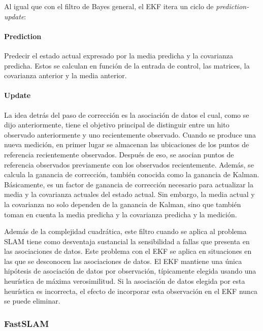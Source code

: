 Al igual que con el filtro de Bayes general, el EKF itera un ciclo de \textit{prediction-update}:

\paragraph{Prediction} Predecir el estado actual expresado por la media predicha y la covarianza predicha. Estos se calculan en función de la entrada de control, las matrices, la covarianza anterior y la media anterior.

\paragraph{Update} La idea detrás del paso de corrección es la asociación de datos el cual, como se dijo anteriormente, tiene el objetivo principal de distinguir entre un hito observado anteriormente y uno recientemente observado. Cuando se produce una nueva medición, en primer lugar se almacenan las ubicaciones de los puntos de referencia recientemente observados. Después de eso, se asocian puntos de referencia observados previamente con los observados recientemente. Además, se calcula la ganancia de corrección, también conocida como la ganancia de Kalman. Básicamente, es un factor de ganancia de corrección necesario para actualizar la media y la covarianza actuales del estado actual. Sin embargo, la media actual y la covarianza no solo dependen de la ganancia de Kalman, sino que también toman en cuenta la media predicha y la covarianza predicha y la medición.

Además de la complejidad cuadrática, este filtro cuando se aplica al problema SLAM tiene como desventaja sustancial 
la sensibilidad a fallas que presenta en las asociaciones de datos. Este problema con el EKF se aplica en situaciones en las que se desconocen las asociaciones de datos. El EKF mantiene una única hipótesis de asociación de datos por observación, típicamente elegida usando una heurística de máxima verosimilitud. Si la asociación de datos elegida por esta heurística es incorrecta, el efecto de incorporar esta observación en el EKF nunca se puede eliminar.

\subsubsection{FastSLAM}
